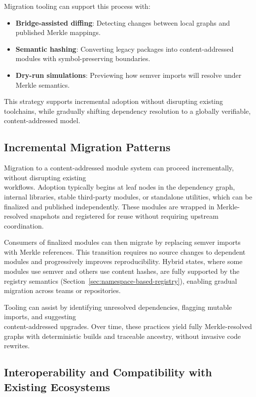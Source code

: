 \documentclass[sigplan,screen]{acmart}
\begin{document}
Migration tooling can support this process with: 
\begin{itemize} 
	\item \textbf{Bridge-assisted diffing}: Detecting changes between local graphs and published Merkle mappings. 
	\item \textbf{Semantic hashing}: Converting legacy packages into content-addressed modules with symbol-pre\-serving boundaries. 
	\item \textbf{Dry-run simulations}: Previewing how semver imports will resolve under Merkle semantics. 
\end{itemize}

This strategy supports incremental adoption without disrupting existing toolchains, while gradually shifting dependency resolution to a globally verifiable, content-addressed model.

\subsection{Incremental Migration Patterns}
\label{sec:incremental-migration}

Migration to a content-addressed module system can proceed incrementally, without disrupting existing \\workflows. Adoption typically begins at leaf nodes in the dependency graph, internal libraries, stable third-party modules, or standalone utilities, which can be finalized and published independently. These modules are wrapped in Merkle-resolved snapshots and registered for reuse without requiring upstream coordination.

Consumers of finalized modules can then migrate by replacing semver imports with Merkle references. This transition requires no source changes to dependent modules and progressively improves reproducibility. Hybrid states, where some modules use semver and others use content hashes, are fully supported by the registry semantics (Section~\ref{sec:namespace-based-registry}), enabling gradual migration across teams or repositories.

Tooling can assist by identifying unresolved dependencies, flagging mutable imports, and suggesting \\content-addressed upgrades. Over time, these practices yield fully Merkle-resolved graphs with deterministic builds and traceable ancestry, without invasive code rewrites.

\subsection{Interoperability and Compatibility with Existing Ecosystems}
\label{sec:interoperability-existing}
\end{document}
